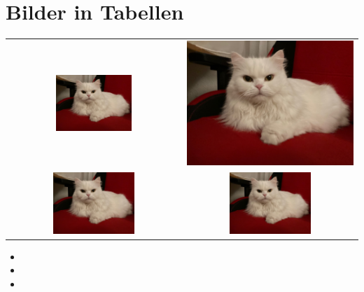 \documentclass[12pt,ngerman,parskip=half]{scrreprt}
\begin{document}
\chapter{Bilder in Tabellen}

\begin{tabular}{cc}
\includegraphics[width=0.45\textwidth]{Bilder/Katze} & \includegraphics[height=0.4\textwidth]{Bilder/Katze} \\
\includegraphics[width=0.49\textwidth]{Bilder/Katze} & \includegraphics[width=0.49\textwidth]{Bilder/Katze} \\
\end{tabular}


\the\textwidth

\the\linewidth

\the\columnwidth

\begin{itemize}
	\item \the\textwidth
	\item \the\linewidth
	\item \the\columnwidth
\end{itemize}






\end{document}
